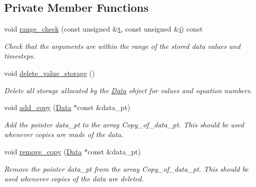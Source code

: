 \subsection*{Private Member Functions}
\begin{DoxyCompactItemize}
\item 
void \hyperlink{classoomph_1_1Data_a3fcd8a39ef027a9329b8e71439cf11bc}{range\+\_\+check} (const unsigned \&\hyperlink{cfortran_8h_af6f0bd3dc13317f895c91323c25c2b8f}{t}, const unsigned \&\hyperlink{cfortran_8h_adb50e893b86b3e55e751a42eab3cba82}{i}) const
\begin{DoxyCompactList}\small\item\em Check that the arguments are within the range of the stored data values and timesteps. \end{DoxyCompactList}\item 
void \hyperlink{classoomph_1_1Data_ac5e1189e9f12749545ab95d560968aee}{delete\+\_\+value\+\_\+storage} ()
\begin{DoxyCompactList}\small\item\em Delete all storage allocated by the \hyperlink{classoomph_1_1Data}{Data} object for values and equation numbers. \end{DoxyCompactList}\item 
void \hyperlink{classoomph_1_1Data_a12041550d37ff348ce82c85076fe36ba}{add\+\_\+copy} (\hyperlink{classoomph_1_1Data}{Data} $\ast$const \&data\+\_\+pt)
\begin{DoxyCompactList}\small\item\em Add the pointer data\+\_\+pt to the array Copy\+\_\+of\+\_\+data\+\_\+pt. This should be used whenever copies are made of the data. \end{DoxyCompactList}\item 
void \hyperlink{classoomph_1_1Data_a3fd7b4d0cc8ac713572f04ffda5a92c7}{remove\+\_\+copy} (\hyperlink{classoomph_1_1Data}{Data} $\ast$const \&data\+\_\+pt)
\begin{DoxyCompactList}\small\item\em Remove the pointer data\+\_\+pt from the array Copy\+\_\+of\+\_\+data\+\_\+pt. This should be used whenever copies of the data are deleted. \end{DoxyCompactList}\end{DoxyCompactItemize}
